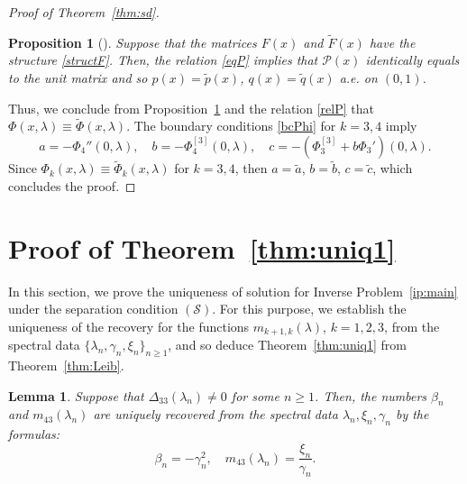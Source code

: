 \documentclass[a4paper,12pt]{article}
\newcommand{\be}{\beta}
\newcommand{\ga}{\gamma}
\newcommand{\la}{\lambda}
\theoremstyle{plain}
\numberwithin{equation}{section}
\newtheorem{lem}[thm]{Lemma}
\newtheorem{prop}[thm]{Proposition}
\theoremstyle{definition}
\theoremstyle{remark}
\begin{document}
\begin{proof}[Proof of Theorem~\ref{thm:sd}]
\begin{prop}[{\cite[Lemma 2.4]{Bond23-mmas}}] \label{prop:P}
Suppose that the matrices $F(x)$ and $\tilde F(x)$ have the structure \eqref{structF}.
Then, the relation \eqref{eqP} implies that $\mathcal P(x)$ identically equals to the unit matrix and so $p(x) = \tilde p(x)$, $q(x) = \tilde q(x)$ a.e. on $(0,1)$. 
\end{prop}

Thus, we conclude from Proposition~\ref{prop:P} and the relation \eqref{relP} that $\Phi(x, \la) \equiv \tilde \Phi(x, \la)$. The boundary conditions \eqref{bcPhi} for $k = 3, 4$ imply
$$
a = -\Phi_4''(0,\la), \quad b = -\Phi_4^{[3]}(0, \la), \quad c = -(\Phi_3^{[3]} + b \Phi_3')(0,\la).
$$
Since $\Phi_k(x, \la) \equiv \tilde \Phi_k(x, \la)$ for $k = 3, 4$, then $a = \tilde a$, $b = \tilde b$, $c = \tilde c$, which concludes the proof.
\end{proof}


\section{Proof of Theorem~\ref{thm:uniq1}} \label{sec:uniq1}

In this section, we prove the uniqueness of solution for Inverse Problem~\ref{ip:main} under the separation condition $(\mathcal S)$. For this purpose, we establish the uniqueness of the recovery for the functions $m_{k+1,k}(\la)$, $k = 1, 2, 3$, from the spectral data $\{ \la_n, \ga_n, \xi_n \}_{n \ge 1}$, and so deduce Theorem~\ref{thm:uniq1} from Theorem~\ref{thm:Leib}. 

\begin{lem} \label{lem:findbg}
Suppose that $\Delta_{33}(\la_n) \ne 0$ for some $n \ge 1$. Then, the numbers $\be_n$ and $m_{43}(\la_n)$ are uniquely recovered from the spectral data $\la_n, \xi_n, \ga_n$ by the formulas:
\begin{equation} \label{findbg}
\be_n = -\gamma_n^2, \quad m_{43}(\la_n) = \frac{\xi_n}{\ga_n}.
\end{equation}
\end{lem}
\end{document}
